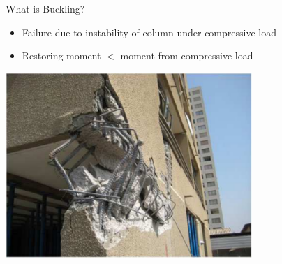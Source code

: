 \documentclass[10pt, svgnames]{beamer}
\begin{document}
\begin{frame}[label={sec:orgce6d9a7}]{What is Buckling?}
\begin{itemize}
\item Failure due to instability of column under compressive load
\item Restoring moment \(<\) moment from compressive load
\end{itemize}

\begin{center}
\includegraphics[width=0.7\textwidth]{pictures/buckled-column.pdf}
\end{center}
\end{frame}
\end{document}
